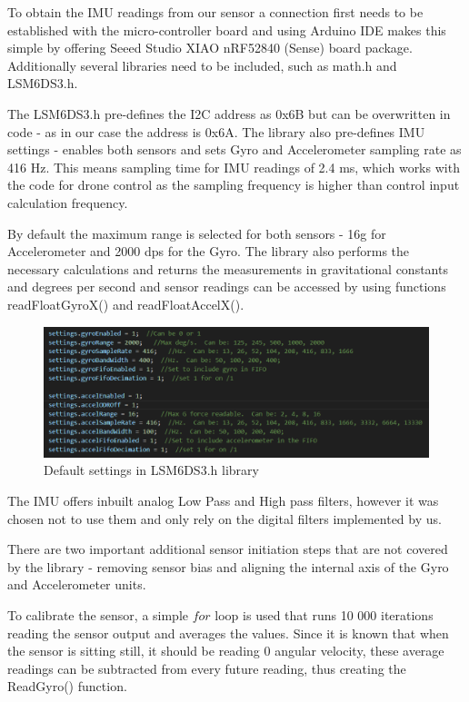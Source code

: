 To obtain the IMU readings from our sensor a connection first needs to be established with the micro-controller board and using Arduino IDE makes this simple by offering Seeed Studio XIAO nRF52840 (Sense) board package. Additionally several libraries need to be included, such as math.h and LSM6DS3.h. 

The LSM6DS3.h \cite{LSM6DS3} pre-defines the I2C address as 0x6B but can be overwritten in code - as in our case the address is 0x6A. 
The library also pre-defines IMU settings - enables both sensors and sets Gyro and Accelerometer sampling rate as 416 Hz. This means sampling time for IMU readings of 2.4 ms, which works with the code for drone control as the sampling frequency is higher than control input calculation frequency. 

By default the maximum range is selected for both sensors - 16g for Accelerometer and 2000 dps for the Gyro. The library also performs the necessary calculations and returns the measurements in gravitational constants and degrees per second and sensor readings can be accessed by using functions readFloatGyroX() and readFloatAccelX().  

\begin{figure}[H]
    \begin{center}
    \includegraphics[scale = 0.55]{pictures/IMU/Library_settings.png}
    \end{center}
    \caption{Default settings in LSM6DS3.h library}
    \label{fig:my_label}
\end{figure}


The IMU offers inbuilt analog Low Pass and High pass filters, however it was chosen not to use them and only rely on the digital filters implemented by us.

There are two important additional sensor initiation steps that are not covered by the library - removing sensor bias and aligning the internal axis of the Gyro and Accelerometer units. 

To calibrate the sensor, a simple $for$ loop is used that runs 10 000 iterations reading the sensor output and averages the values. Since it is known that when the sensor is sitting still, it should be reading 0 angular velocity, these average readings can be subtracted from every future reading, thus creating the ReadGyro() function. 


